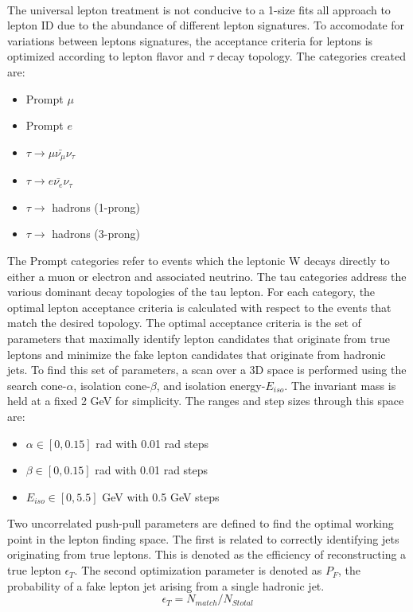 \quad \quad \\
The universal lepton treatment is not conducive to a 1-size fits all approach to lepton ID due to the abundance of different lepton signatures. To accomodate for variations between leptons signatures, the acceptance criteria for leptons is optimized according to lepton flavor and $\tau$ decay topology. The categories created are:
\begin{itemize}
\item Prompt $\mu$
\item Prompt $e$
\item $\tau \rightarrow \mu \bar{\nu_{\mu}} \nu_{\tau} $
\item $\tau \rightarrow e \bar{\nu_{e}} \nu_{\tau} $
\item $\tau \rightarrow$ hadrons (1-prong)
\item $\tau \rightarrow$ hadrons (3-prong)
\end{itemize} 
The Prompt categories refer to events which the leptonic W decays directly to either a muon or electron and associated neutrino. The tau categories address the various dominant decay topologies of the tau lepton. For each category, the optimal lepton acceptance criteria is calculated with respect to the events that match the desired topology. The optimal acceptance criteria is the set of parameters that maximally identify lepton candidates that originate from true leptons and minimize the fake lepton candidates that originate from hadronic jets. To find this set of parameters, a scan over a 3D space is performed using the search cone-$\alpha$, isolation cone-$\beta$, and isolation energy-$E_{iso}$. The invariant mass is held at a fixed 2 GeV for simplicity. The ranges and step sizes through this space are:
 \begin{itemize}
 \item $\alpha \in [0,0.15]$ rad with 0.01 rad steps
 \item $\beta \in [0,0.15]$ rad with 0.01 rad steps
 \item $E_{iso} \in [0,5.5]$ GeV with 0.5 GeV steps
 \end{itemize}
Two uncorrelated push-pull parameters are defined to find the optimal working point in the lepton finding space. The first is related to correctly identifying jets originating from true leptons. This is denoted as the efficiency of reconstructing a true lepton $\epsilon_T$. The second optimization parameter is denoted as $P_F$, the probability of a fake lepton jet arising from a single hadronic jet.  
\begin{equation}
\label{eq:et}
\epsilon_T = N_{match}/N_{Stotal}
\end{equation}
